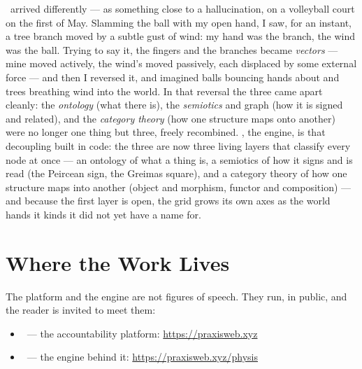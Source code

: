 \physis\ arrived differently --- as something close to a hallucination, on a
volleyball court on the first of May. Slamming the ball with my open hand, I saw,
for an instant, a tree branch moved by a subtle gust of wind: my hand was the
branch, the wind was the ball. Trying to say it, the fingers and the branches
became \emph{vectors} --- mine moved actively, the wind's moved passively, each
displaced by some external force --- and then I reversed it, and imagined balls
bouncing hands about and trees breathing wind into the world. In that reversal
the three came apart cleanly: the \emph{ontology} (what there is), the
\emph{semiotics} and graph (how it is signed and related), and the
\emph{category theory} (how one structure maps onto another) were no longer one
thing but three, freely recombined. \physis, the engine, is that decoupling built
in code: the three are now three living layers that classify every node at once ---
an ontology of what a thing is, a semiotics of how it signs and is read (the
Peircean sign, the Greimas square), and a category theory of how one structure maps
into another (object and morphism, functor and composition) --- and because the
first layer is open, the grid grows its own axes as the world hands it kinds it did
not yet have a name for.

\section*{Where the Work Lives}

The platform and the engine are not figures of speech. They run, in public, and
the reader is invited to meet them:

\begin{itemize}
\item \praxis\ --- the accountability platform: \url{https://praxisweb.xyz}
\item \physis\ --- the engine behind it: \url{https://praxisweb.xyz/physis}
\end{itemize}
